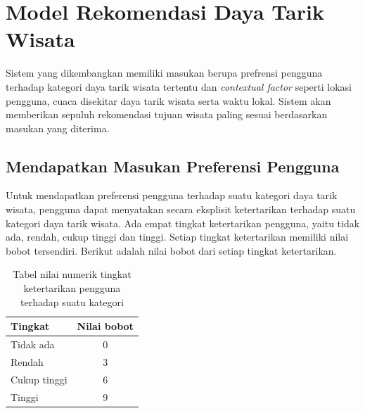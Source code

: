 \section{Model Rekomendasi Daya Tarik Wisata}
Sistem yang dikembangkan memiliki masukan berupa prefrensi pengguna terhadap kategori daya tarik wisata tertentu dan 
\textit{contextual factor} seperti lokasi pengguna, cuaca disekitar daya tarik wisata serta waktu lokal. Sistem akan memberikan sepuluh rekomendasi tujuan wisata
paling sesuai berdasarkan masukan yang diterima.

\subsection{Mendapatkan Masukan Preferensi Pengguna}

Untuk mendapatkan preferensi pengguna terhadap suatu kategori daya tarik wisata, pengguna dapat menyatakan secara eksplisit ketertarikan terhadap suatu kategori daya tarik wisata.
Ada empat tingkat ketertarikan pengguna, yaitu tidak ada, rendah, cukup tinggi dan tinggi. Setiap tingkat ketertarikan memiliki nilai bobot tersendiri. Berikut adalah nilai bobot dari
setiap tingkat ketertarikan.
\begin{table}[h]
\begin{center}
\begin{tabular}{ |l|c| } 
\hline
	\textbf{Tingkat} & \textbf{Nilai bobot}\\
	\hline
	Tidak ada & 0 \\
	\hline
	Rendah & 3 \\
	\hline
	Cukup tinggi & 6\\
	\hline
	Tinggi & 9\\
	\hline
\end{tabular}
\end{center}
\caption{Tabel nilai numerik tingkat ketertarikan pengguna terhadap suatu kategori}
\label{table:weight-pref}
\end{table}


